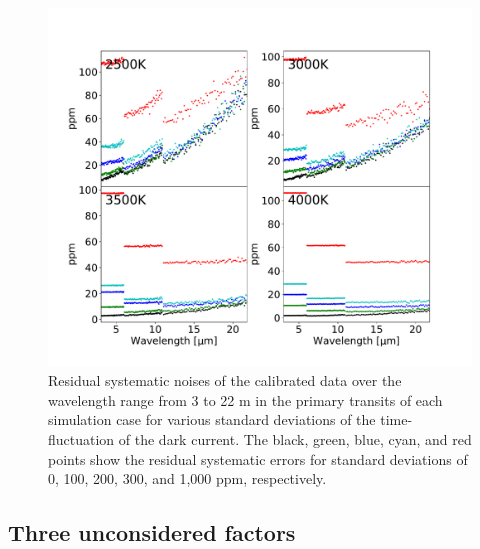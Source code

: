 \documentclass{aastex62}
\begin{document}
\begin{figure}[H]
\begin{center}
\includegraphics[width=12cm]{variation_dark.pdf}
\caption{Residual systematic noises of the calibrated data over the wavelength range from 3 to 22 \textmu m in the primary transits of each simulation case for various standard deviations of the time-fluctuation of the dark current. The black, green, blue, cyan, and red points show the residual systematic errors for standard deviations of 0, 100, 200, 300, and 1,000 ppm, respectively. \label{fig:variation_dark}}
\end{center}
\end{figure}


\subsection{Three unconsidered factors} \label{subsec:three_factors}
\end{document}
